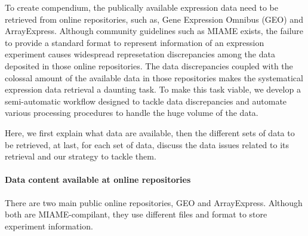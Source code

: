 

To create compendium, the publically available expression data need to be
retrieved from online repositories, such as, Gene Expression Omnibus (GEO)
and ArrayExpress.
%
Although community guidelines such as MIAME \cite{Brazma2001} exists, the
failure to provide a standard format to represent information of an expression
experiment causes widespread represetation discrepancies among the data
deposited in those online repositories.
%
The data discrepancies coupled with the colossal amount of the available data
in those repositories makes the systematical expression data retrieval a
daunting task.
%
To make this task viable, we develop a semi-automatic workflow designed to
tackle data discrepancies and automate various processing procedures to handle
the huge volume of the data.

Here, we first explain what data are available, then the different sets of data
to be retrieved, at last, for each set of data, discuss the data issues related
to its retrieval and our strategy to tackle them.
%



\paragraph{Data content available at online repositories}\label{sec:command-data-content-online}

There are two main public online repositories, GEO and ArrayExpress.
%
Although both are MIAME-compilant, they use different files and format to store
experiment information.

